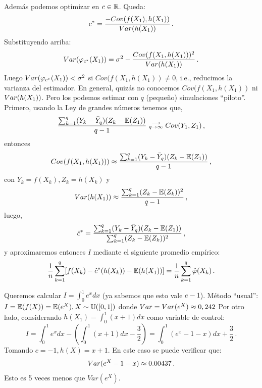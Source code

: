 Además podemos optimizar en $c\in\mathbb{R}$. Queda:
$$ c^*=\displaystyle\frac{-Cov(f(X_1),h(X_1))}{Var(h(X_1))} \, .$$
Substituyendo arriba:
$$ Var(\varphi_{c^*}(X_1))=\sigma^2-\displaystyle\frac{Cov(f(X_1,h(X_1)))^2}{Var(h(X_1))} \, .$$
Luego $Var(\varphi_{c^*}(X_1))<\sigma^2$ si $Cov(f(X_1,h(X_1))\neq 0$, i.e., reducimos la varianza del estimador.
\newp En general, quizás no conocemos $Cov(f(X_1,h(X_1))$ ni $Var(h(X_1))$. Pero los podemos estimar con $q$ (pequeño) simulaciones ``piloto''. Primero, usando la Ley de grandes números tenemos que,
$$ \displaystyle\frac{\sum_{k=1}^q(Y_k-\bar{Y}_q)(Z_k-\mathbb{E}(Z_1))}{q-1} \mbox{ }\substack{\longrightarrow \\ q\to\infty}\mbox{ } Cov(Y_1,Z_1) \, ,$$
entonces
$$ Cov(f(X_1,h(X_1)))\approx \displaystyle\frac{\sum_{k=1}^q(Y_k-\bar{Y}_q)(Z_k-\mathbb{E}(Z_1))}{q-1} \, ,$$
con $Y_k=f(X_k),Z_k=h(X_k)$ y 
$$Var(h(X_1))\approx \displaystyle\frac{\sum_{k=1}^q(Z_k-\mathbb{E}(Z_k))^2}{q-1} \, ,$$
luego,
$$ \hat{c}^*=\displaystyle\frac{\sum_{k=1}^q(Y_k-\bar{Y}_q)(Z_k-\mathbb{E}(Z_1))}{\sum_{k=1}^q(Z_k-\mathbb{E}(Z_k))^2} \, ,$$
y aproximaremos entonces $I$ mediante el siguiente promedio empírico:
$$ \displaystyle \frac{1}{n}\sum^q_{k=1}[f(X_k)-\hat{c}^*(h(X_k))-\mathbb{E}(h(X_1))]=\frac{1}{n}\sum^q_{k=1}\hat{\varphi}(X_k) \, .$$
\begin{example}
Queremos calcular $I=\int^1_0e^xdx$ (ya sabemos que esto vale $e-1$).
\newp Método ``usual'': $I=\mathbb{E}(f(X))=\mathbb{E}(e^X),X\sim \mathbb{U}([0,1])$ donde $Var=Var(e^X)\approx0,242$
\newp Por otro lado, considerando $h(X_1)=\int^1_0(x+1)dx$ como variable de control:
$$ I=\int^1_0e^xdx - (\int^1_0(x+1)dx-\frac{3}{2})=\int^1_0(e^x-1-x)dx+\frac{3}{2} \, .$$
Tomando $c=-1,h(X)=x+1$. En este caso se puede verificar que:
$$ Var(e^X-1-x)\approx0.00437 \, .$$
Esto es 5 veces menos que $Var(e^X)$.
\end{example}

